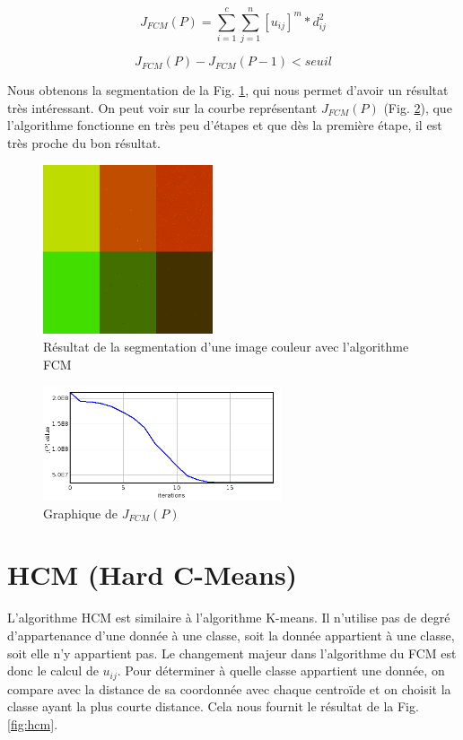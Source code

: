 \documentclass[a4paper,11pt]{article}
\begin{document}
\begin{equation}
  \label{jp}
  J_{FCM}(P)=\sum_{i=1}^{c}\sum_{j=1}^{n}[u_{ij}]^m * d_{ij}^2
\end{equation}

\begin{equation}
  \label{jpMin} 
  J_{FCM}(P) - J_{FCM}(P-1) < seuil
\end{equation}

Nous obtenons la segmentation de la Fig. \ref{fig:segmentationFCM}, qui nous permet d'avoir
un résultat très intéressant. On peut voir sur la courbe représentant $J_{FCM}(P)$ (Fig. \ref{fig:graphFCM}), que l'algorithme
fonctionne en très peu d'étapes et que dès la première étape, il est très proche du bon résultat.

\begin{figure}[!h]
  \begin{center}
    \includegraphics[width=5cm]{resultat/FCM.png}
    \caption{Résultat de la segmentation d'une image couleur avec l'algorithme FCM}
    \label{fig:segmentationFCM}
  \end{center}
\end{figure}

\begin{figure}[!h]
  \begin{center}
    \includegraphics[width=7cm]{resultat/FCM_graph.png}
    \caption{Graphique de $J_{FCM}(P)$}
    \label{fig:graphFCM}
  \end{center}
\end{figure}

\section{HCM (Hard C-Means)}
L'algorithme HCM est similaire à l'algorithme K-means. Il n'utilise pas de degré d'appartenance
d'une donnée à une classe, soit la donnée appartient à une classe, soit elle n'y appartient pas.
Le changement majeur dans l'algorithme du FCM est donc le calcul de $u_{ij}$. Pour déterminer à quelle
classe appartient une donnée, on compare avec la distance de sa coordonnée avec chaque centroïde et
on choisit la classe ayant la plus courte distance. Cela nous fournit le résultat de la Fig. \ref{fig:hcm}.\\
\end{document}
